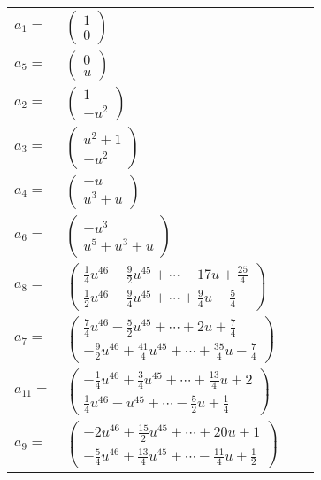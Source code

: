 \documentclass[1p]{elsarticle_modified}
\theoremstyle{definition}
\begin{document}
\begin{tabular}{m{7pt} m{180pt} m{7pt} m{180pt} }
\flushright $a_{1}=$&$\begin{pmatrix}1\\0\end{pmatrix}$ \\
\flushright $a_{5}=$&$\begin{pmatrix}0\\u\end{pmatrix}$ \\
\flushright $a_{2}=$&$\begin{pmatrix}1\\- u^2\end{pmatrix}$ \\
\flushright $a_{3}=$&$\begin{pmatrix}u^2+1\\- u^2\end{pmatrix}$ \\
\flushright $a_{4}=$&$\begin{pmatrix}- u\\u^3+u\end{pmatrix}$ \\
\flushright $a_{6}=$&$\begin{pmatrix}- u^3\\u^5+u^3+u\end{pmatrix}$ \\
\flushright $a_{8}=$&$\begin{pmatrix}\frac{1}{4} u^{46}-\frac{9}{2} u^{45}+\cdots-17 u+\frac{25}{4}\\\frac{1}{2} u^{46}-\frac{9}{4} u^{45}+\cdots+\frac{9}{4} u-\frac{5}{4}\end{pmatrix}$ \\
\flushright $a_{7}=$&$\begin{pmatrix}\frac{7}{4} u^{46}-\frac{5}{2} u^{45}+\cdots+2 u+\frac{7}{4}\\-\frac{9}{2} u^{46}+\frac{41}{4} u^{45}+\cdots+\frac{35}{4} u-\frac{7}{4}\end{pmatrix}$ \\
\flushright $a_{11}=$&$\begin{pmatrix}-\frac{1}{4} u^{46}+\frac{3}{4} u^{45}+\cdots+\frac{13}{4} u+2\\\frac{1}{4} u^{46}- u^{45}+\cdots-\frac{5}{2} u+\frac{1}{4}\end{pmatrix}$ \\
\flushright $a_{9}=$&$\begin{pmatrix}-2 u^{46}+\frac{15}{2} u^{45}+\cdots+20 u+1\\-\frac{5}{4} u^{46}+\frac{13}{4} u^{45}+\cdots-\frac{11}{4} u+\frac{1}{2}\end{pmatrix}$ \\

\end{tabular}
\end{document}

